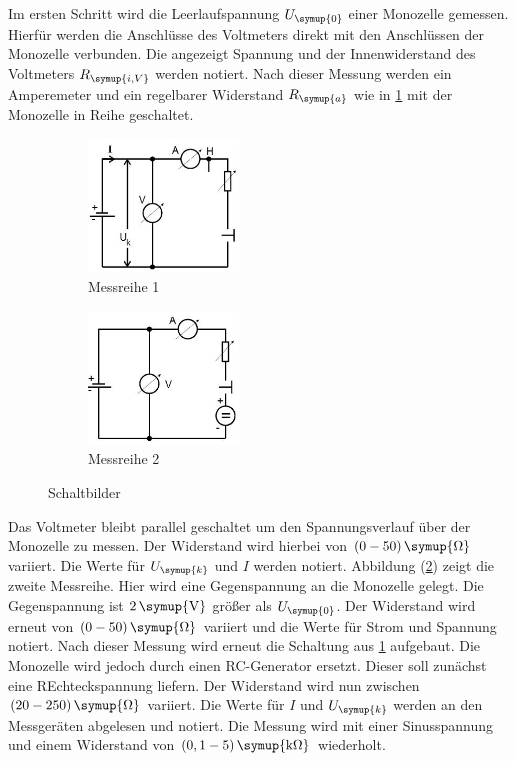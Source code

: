 Im ersten Schritt wird die Leerlaufspannung $U_\symup{0}$ einer Monozelle
gemessen. Hierfür werden die Anschlüsse des Voltmeters direkt mit den Anschlüssen
der Monozelle verbunden. Die angezeigt Spannung und der Innenwiderstand des
Voltmeters $R_\symup{i,V}$ werden notiert.
Nach dieser Messung werden ein Amperemeter und ein regelbarer Widerstand
$R_\symup{a}$ wie in \ref{fig:schlt1} mit der Monozelle in Reihe geschaltet.
\begin{figure}[H]
  \centering
  \begin{subfigure}{0.48\textwidth}
    \centering
    \includegraphics[width=4cm]{bilder/sinrecht.jpg}
    \caption{Messreihe 1}
    \label{fig:schlt1}
  \end{subfigure}
  \begin{subfigure}{0.48\textwidth}
    \centering
    \includegraphics[width=4cm]{bilder/gegenspannung.jpg}
    \caption{Messreihe 2}
    \label{fig:schlt2}
  \end{subfigure}
  \caption{Schaltbilder \cite{301}}
  \label{fig:schlt}
\end{figure}
Das Voltmeter bleibt parallel geschaltet um den Spannungsverlauf über der
Monozelle zu messen. Der Widerstand wird hierbei von $(0-50)\,\symup{\si{\ohm}}$
variiert. Die Werte für $U_\symup{k}$ und $I$ werden notiert.
Abbildung (\ref{fig:schlt2}) zeigt die zweite Messreihe. Hier wird eine
Gegenspannung an die Monozelle gelegt. Die Gegenspannung ist $2\,\symup{\si{\volt}}$
größer als $U_\symup{0}$. Der Widerstand wird erneut von $(0-50)\,\symup{\si{\ohm}}$
variiert und die Werte für Strom und Spannung notiert.
Nach dieser Messung wird erneut die Schaltung aus \ref{fig:schlt1} aufgebaut.
Die Monozelle wird jedoch durch einen RC-Generator ersetzt. Dieser soll zunächst
eine REchteckspannung liefern. Der Widerstand wird nun zwischen $(20-250)\,\symup{\si{\ohm}}$
variiert. Die Werte für $I$ und $U_\symup{k}$ werden an den Messgeräten
abgelesen und notiert.
Die Messung wird mit einer Sinusspannung und einem Widerstand von
$(0,1-5)\,\symup{\si{\kilo\ohm}}$ wiederholt.

